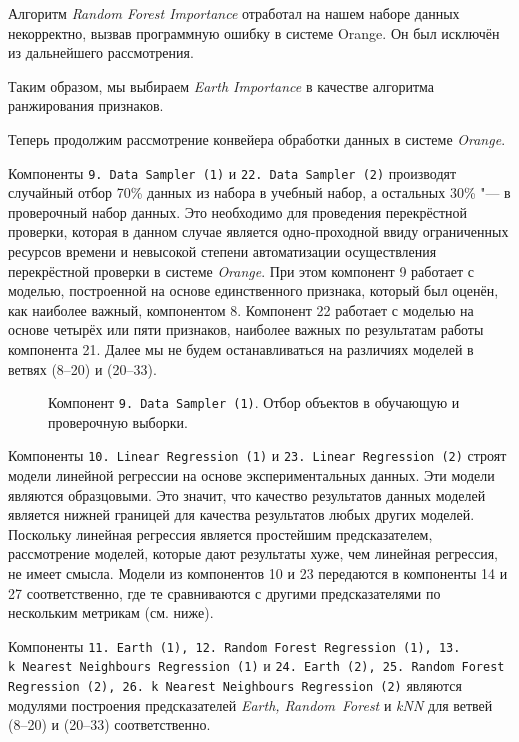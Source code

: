Алгоритм \textit{Random Forest Importance} отработал на нашем наборе данных некорректно, вызвав программную ошибку в системе Orange. Он был исключён из дальнейшего рассмотрения.

Таким образом, мы выбираем \textit{Earth Importance} в качестве алгоритма ранжирования признаков.

Теперь продолжим рассмотрение конвейера обработки данных в системе \textit{Orange}.

Компоненты \texttt{9.\,Data~Sampler~(1)} и \texttt{22.\,Data~Sampler~(2)} производят случайный отбор 70\% данных из набора в учебный набор, а остальных 30\% "--- в проверочный набор данных. Это необходимо для проведения перекрёстной проверки, которая в данном случае является одно-проходной ввиду ограниченных ресурсов времени и невысокой степени автоматизации осуществления перекрёстной проверки в системе \textit{Orange}. При этом компонент 9 работает с моделью, построенной на основе единственного признака, который был оценён, как наиболее важный, компонентом 8. Компонент 22 работает с моделью на основе четырёх или пяти признаков, наиболее важных по результатам работы компонента 21. Далее мы не будем останавливаться на различиях моделей в ветвях (8--20) и (20--33).

\begin{figure}[H]
    \caption{Компонент \texttt{9.\,Data~Sampler~(1)}. Отбор объектов в обучающую и проверочную выборки.}
    \label{img:9-Data-Sampler-1}
\end{figure}

Компоненты \texttt{10.\,Linear~Regression~(1)} и \texttt{23.\,Linear~Regression~(2)} строят модели линейной регрессии на основе экспериментальных данных. Эти модели являются образцовыми. Это значит, что качество результатов данных моделей является нижней границей для качества результатов любых других моделей. Поскольку линейная регрессия является простейшим предсказателем, рассмотрение моделей, которые дают результаты хуже, чем линейная регрессия, не имеет смысла. Модели из компонентов 10 и 23 передаются в компоненты 14 и 27 соответственно, где те сравниваются с другими предсказателями по нескольким метрикам (см. ниже).

Компоненты \texttt{11.\,Earth~(1), 12.\,Random~Forest Regression~(1), 13.\,k~Nearest~Neighbours Regression~(1)} и \texttt{24.\,Earth~(2), 25.~Random~Forest Regression~(2), 26.\,k~Nearest~Neighbours Regression~(2)} являются модулями построения предсказателей \textit{Earth, Random~Forest} и \textit{kNN} для ветвей (8--20) и (20--33) соответственно.

